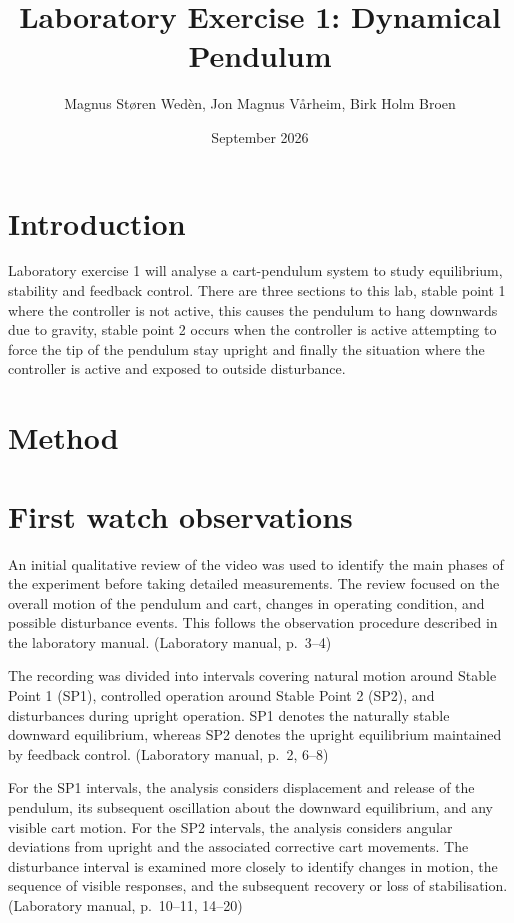 \documentclass[11pt,a4paper]{article}
\newcommand{\manual}[1]{(Laboratory manual, p.~#1)}
\begin{document}
\title{Laboratory Exercise 1: Dynamical Pendulum}
\author{Magnus Støren Wedèn, Jon Magnus Vårheim, Birk Holm Broen}
\date{September 2026}

\maketitle

\section{Introduction}
Laboratory exercise 1 will analyse a cart-pendulum system to study equilibrium, stability and feedback control. There are three sections to this lab, stable point 1 where the controller is not active, this causes the pendulum to hang downwards due to gravity, stable point 2 occurs when the controller is active attempting to force the tip of the pendulum stay upright and finally the situation where the controller is active and exposed to outside disturbance. 


\section{Method}

\section{First watch observations}
An initial qualitative review of the video was used to identify
the main phases of the experiment before taking detailed
measurements. The review focused on the overall motion of the
pendulum and cart, changes in operating condition, and possible
disturbance events. This follows the observation procedure
described in the laboratory manual. \manual{3--4}

The recording was divided into intervals covering natural motion
around Stable Point 1 (SP1), controlled operation around Stable
Point 2 (SP2), and disturbances during upright operation.
SP1 denotes the naturally stable downward equilibrium, whereas
SP2 denotes the upright equilibrium maintained by feedback
control. \manual{2, 6--8}

For the SP1 intervals, the analysis considers displacement and
release of the pendulum, its subsequent oscillation about the
downward equilibrium, and any visible cart motion.
For the SP2 intervals, the analysis considers angular deviations
from upright and the associated corrective cart movements.
The disturbance interval is examined more closely to identify
changes in motion, the sequence of visible responses, and the
subsequent recovery or loss of stabilisation.
\manual{10--11, 14--20}
\end{document}
